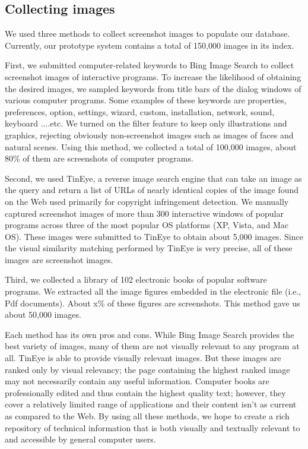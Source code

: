 \documentclass{www2010-submission}
\begin{document}
\subsection{Collecting images}


We used three methods to collect screenshot images to populate our
database. Currently, our prototype system contains a total of
150,000 images in its index.

First, we submitted computer-related keywords to Bing Image Search
to collect screenshot images of interactive programs. To increase
the likelihood of obtaining the desired images, we sampled
keywords from title bars of the dialog windows of various computer
programs. Some examples of these keywords are properties,
preferences, option, settings, wizard, custom, installation,
network, sound, keyboard ....etc. We turned on the filter feature
to keep only illustrations and graphics, rejecting obviously
non-screenshot images such as images of faces and natural scenes.
Using this method, we collected a total of 100,000 images, about
80\% of them are screenshots of computer programs.

Second, we used TinEye, a reverse image search engine that can
take an image as the query and return a list of URLs of nearly
identical copies of the image found on the Web used primarily for copyright
infringement detection. We manually captured screenshot images of more than
300 interactive windows of popular programs across three of the
most popular OS platforms (XP, Vista, and Mac OS). These images
were submitted to TinEye to obtain about 5,000 images. Since the
visual similarity matching performed by TinEye is very precise,
all of these images are screenshot images.

Third, we collected a library of 102 electronic books of popular
software programs. We extracted all the image figures embedded in
the electronic file (i.e., Pdf documents). About x\% of these
figures are screenshots. This method gave us about 50,000 images.

Each method has its own pros and cons. While Bing Image Search
provides the best variety of images, many of them are not visually
relevant to any program at all. TinEye is able to provide visually
relevant images. But these images are ranked only by visual
relevancy; the page containing the highest ranked image may not
necessarily contain any useful information. Computer books are
professionally edited and thus contain the highest quality
text; however, they cover a relatively limited range of applications
and their content isn't as current as compared to the Web. By
using all these methods, we hope to create a rich repository of
technical information that is both visually and textually relevant
to and accessible by general computer users.
 
\end{document}
